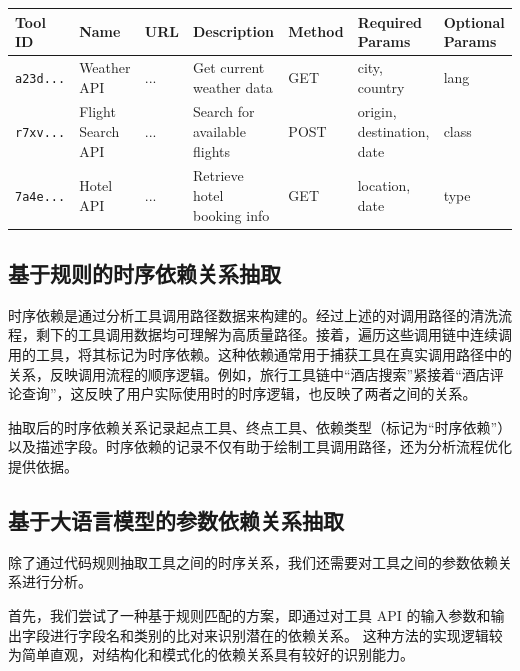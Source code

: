 \begin{table}[ht]
    \centering
    \label{tab:csv-example-tool}
    \renewcommand{\arraystretch}{1.2}
    \scriptsize %
    \begin{tabular}{|l|l|l|l|l|l|l|}
    \hline
    \textbf{Tool ID} & \textbf{Name} & \textbf{URL} & \textbf{Description} & \textbf{Method} & \textbf{Required Params} & \textbf{Optional Params} \\ \hline
    \texttt{a23d...} & Weather API & ... & Get current weather data & GET & city, country & lang \\ \hline
    \texttt{r7xv...} & Flight Search API & ... & Search for available flights & POST & origin, destination, date & class \\ \hline
    \texttt{7a4e...} & Hotel API & ... & Retrieve hotel booking info & GET & location, date & type \\ \hline
    \end{tabular}
    \end{table}

\subsection{基于规则的时序依赖关系抽取}

时序依赖是通过分析工具调用路径数据来构建的。经过上述的对调用路径的清洗流程，剩下的工具调用数据均可理解为高质量路径。接着，遍历这些调用链中连续调用的工具，将其标记为时序依赖。这种依赖通常用于捕获工具在真实调用路径中的关系，反映调用流程的顺序逻辑。例如，旅行工具链中“酒店搜索”紧接着“酒店评论查询”，这反映了用户实际使用时的时序逻辑，也反映了两者之间的关系。

抽取后的时序依赖关系记录起点工具、终点工具、依赖类型（标记为“时序依赖”）以及描述字段。时序依赖的记录不仅有助于绘制工具调用路径，还为分析流程优化提供依据。

\subsection{基于大语言模型的参数依赖关系抽取}

除了通过代码规则抽取工具之间的时序关系，我们还需要对工具之间的参数依赖关系进行分析。

首先，我们尝试了一种基于规则匹配的方案，即通过对工具 API 的输入参数和输出字段进行字段名和类别的比对来识别潜在的依赖关系。
这种方法的实现逻辑较为简单直观，对结构化和模式化的依赖关系具有较好的识别能力。

